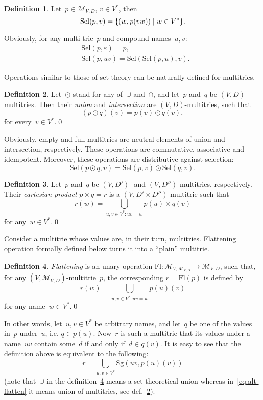\documentclass{article}
\theoremstyle{definition}
\newtheorem{Df}{Definition}
\newcommand{\set}[1]{\mathcal{#1}}
\newcommand{\setmt}[2]{\set{M}_{#1,#2}}
\newcommand{\flatten}{\mathrm{Fl}}
\newcommand{\select}{\mathrm{Sel}}
\newcommand{\singleleaf}{\mathrm{Sg}}
\begin{document}
\begin{Df}\label{def:select}
Let~$p\in\setmt{V}{D}$, $v\in V^\ast$, then
\[
  \select(p,v) = \{ (w, p(vw)) \mid w\in V^\ast \} .\qedhere
\]
\end{Df}

Obviously, for any multi-trie~$p$ and compound names~$u,v$:
\begin{eqnarray*}
  & \select(p,\varepsilon) = p ,\\
  & \select(p,uv) = \select(\select(p,u), v) .
\end{eqnarray*}

Operations similar to those of set theory can be naturally defined for multitries.

\begin{Df}\label{def:union-intersection}
Let~$\odot$ stand for any of~$\cup$ and~$\cap$, and let~$p$ and~$q$ be
$(V,D)$-multitries. Then their \emph{union} and \emph{intersection} are
$(V,D)$-multitries, such that
\[
  (p\odot q)(v) = p(v) \odot q(v) ,
\]
for every~$v\in V^\ast$.\qed
\end{Df}

Obviously, empty and full multitries are neutral elements of union and intersection,
respectively. These operations are commutative, associative and idempotent.
Moreover, these operations are distributive against selection:
\[
  \select(p\odot q, v) = \select(p, v) \odot \select(q, v) .
\]

\begin{Df}
Let~$p$ and~$q$ be $(V,D')$- and $(V,D'')$-multitries, respectively. Their
\emph{cartesian product} $p\times q = r$ is a $(V,D'\times D'')$-multitrie
such that
\[
  r(w) = \bigcup_{u,v\in V^\ast: uv = w} p(u) \times q(v)
\]
for any~$w\in V^\ast$.\qed
\end{Df}

Consider a multitrie whose values are, in their turn, multitries.
Flattening operation formally defined below turns it into a ``plain'' multitrie.
\begin{Df}\label{def:flatten}
\emph{Flattening} is an unary operation $\flatten : \setmt{V}{\setmt{V}{D}}
\to\setmt{V}{D}$, such that, for any $(V,\setmt{V}{D})$-multitrie~$p$, the
corresponding $r=\flatten(p)$ is defined by
\[
  r(w) = \bigcup_{u,v\in V^\ast: uv = w} p(u)(v)
\]
for any name~$w\in V^\ast$.\qed
\end{Df}

In other words, let~$u, v\in V^\ast$ be arbitrary names, and let~$q$ be one of
the values in~$p$ under~$u$, i.e. $q \in p(u)$. Now~$r$ is such a multitrie that its
values under a name~$uv$ contain some~$d$ if and only if~$d\in q(v)$. It is
easy to see that the definition above is equivalent to the following:
\begin{equation}\label{eq:alt-flatten}
  r = \bigcup_{u,v\in V^\ast} \singleleaf(uv, p(u)(v))
\end{equation}
(note that~$\cup$ in the definition~\ref{def:flatten} means a set-theoretical
union whereas in~\ref{eq:alt-flatten} it means union of multitries, see
def.~\ref{def:union-intersection}).
\end{document}
